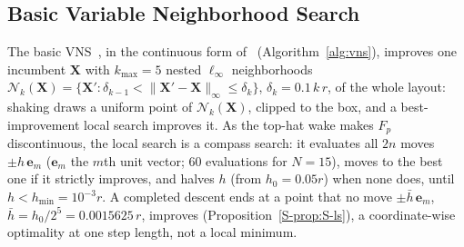 
\subsection{Basic Variable Neighborhood Search}
\label{sec:vns}
The basic VNS~\cite{Mladenovic1997,Hansen2001}, in the continuous form of~\cite{Mladenovic2008} (Algorithm~\ref{alg:vns}), improves one incumbent $\mathbf X$ with $k_{\max}=5$ nested $\ell_\infty$ neighborhoods $\mathcal N_k(\mathbf X)=\{\mathbf X':\delta_{k-1}<\lVert \mathbf X'-\mathbf X\rVert_\infty\le\delta_k\}$, $\delta_k=0.1\,k\,r$, of the whole layout: shaking draws a uniform point of $\mathcal N_k(\mathbf X)$, clipped to the box, and a best-improvement local search improves it. As the top-hat wake makes $F_p$ discontinuous, the local search is a compass search: it evaluates all $2n$ moves $\pm h\,\mathbf e_m$ ($\mathbf e_m$ the $m$th unit vector; 60 evaluations for $N=15$), moves to the best one if it strictly improves, and halves $h$ (from $h_0=0.05r$) when none does, until $h<h_{\min}=10^{-3}r$. A completed descent ends at a point that no move $\pm\bar h\,\mathbf e_m$, $\bar h=h_0/2^5=0.0015625\,r$, improves (Proposition~\ref{S-prop:S-ls}), a coordinate-wise optimality at one step length, not a local minimum.

